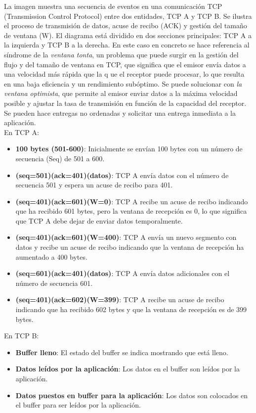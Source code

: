\documentclass[a4paper,12pt]{article}
\begin{document}
La imagen muestra una secuencia de eventos en una comunicación TCP (Transmission Control Protocol) entre dos entidades, TCP A y TCP B. Se ilustra el proceso de transmisión de datos, acuse de recibo (ACK) y gestión del tamaño de ventana (W). El diagrama está dividido en dos secciones principales: TCP A a la izquierda y TCP B a la derecha. En este caso en concreto se hace referencia al síndrome de la \textit{ventana tonta}, un problema que puede surgir en la gestión del flujo y del tamaño de ventana en TCP, que significa que el emisor envía datos a una velocidad más rápida que la q  ue el receptor puede procesar, lo que resulta en una baja eficiencia y un rendimiento subóptimo. Se puede solucionar con \textit{la ventana optimista}, que permite al emisor enviar datos a la máxima velocidad posible y ajustar la tasa de transmisión en función de la capacidad del receptor. Se pueden hace entregas no ordenadas y solicitar una entrega inmediata a la aplicación.\\

En TCP A:
\begin{itemize}
    \item \textbf{100 bytes (501-600)}: Inicialmente se envían 100 bytes con un número de secuencia (Seq) de 501 a 600.
    \item \textbf{(seq=501)(ack=401)(datos)}: TCP A envía datos con el número de secuencia 501 y espera un acuse de recibo para 401.
    \item \textbf{(seq=401)(ack=601)(W=0)}: TCP A recibe un acuse de recibo indicando que ha recibido 601 bytes, pero la ventana de recepción es 0, lo que significa que TCP A debe dejar de enviar datos temporalmente.
    \item \textbf{(seq=401)(ack=601)(W=400)}: TCP A envía un nuevo segmento con datos y recibe un acuse de recibo indicando que la ventana de recepción ha aumentado a 400 bytes.
    \item \textbf{(seq=601)(ack=401)(datos)}: TCP A envía datos adicionales con el número de secuencia 601.
    \item \textbf{(seq=401)(ack=602)(W=399)}: TCP A recibe un acuse de recibo indicando que ha recibido 602 bytes y que la ventana de recepción es de 399 bytes.
\end{itemize}

En TCP B:
\begin{itemize}
    \item \textbf{Buffer lleno}: El estado del buffer se indica mostrando que está lleno.
    \item \textbf{Datos leídos por la aplicación}: Los datos en el buffer son leídos por la aplicación.
    \item \textbf{Datos puestos en buffer para la aplicación}: Los datos son colocados en el buffer para ser leídos por la aplicación.
\end{itemize}
\end{document}
